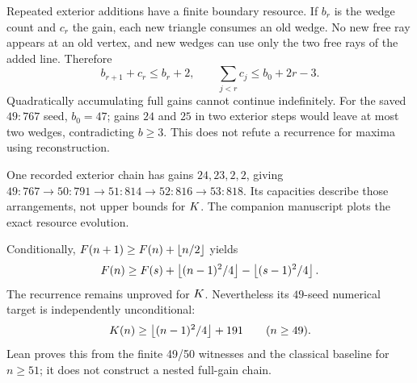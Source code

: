 Repeated exterior additions have a finite boundary resource.  If $b_r$
is the wedge count and $c_r$ the gain, each new triangle consumes an
old wedge.  No new free ray appears at an old vertex, and new wedges
can use only the two free rays of the added line.  Therefore
\begin{equation}
 b_{r+1}+c_r\le b_r+2,\qquad
 \sum_{j<r}c_j\le b_0+2r-3.
 \label{jext:budget}
\end{equation}
Quadratically accumulating full gains cannot continue indefinitely.
For the saved $49:767$ seed, $b_0=47$; gains $24$ and $25$ in two
exterior steps would leave at most two wedges, contradicting $b\ge3$.
This does not refute a recurrence for maxima using reconstruction.

One recorded exterior chain has gains $24,23,2,2$, giving
$49{:}767\to50{:}791\to51{:}814\to52{:}816\to53{:}818$.
Its capacities describe those arrangements, not upper bounds for $K$.
The companion manuscript plots the exact resource evolution.


Conditionally, $F(n+1)\ge F(n)+\left\lfloor n/2\right\rfloor$ yields
\[
 F(n)\ge F(s)+\left\lfloor(n-1)^2/4\right\rfloor-\left\lfloor(s-1)^2/4\right\rfloor.
\]
The recurrence remains unproved for $K$.  Nevertheless its $49$-seed
numerical target is independently unconditional:
\begin{equation}
 K(n)\ge\left\lfloor(n-1)^2/4\right\rfloor+191\qquad(n\ge49).
 \label{jext:49}
\end{equation}
Lean proves this from the finite 49/50 witnesses and the classical
baseline for $n\ge51$; it does not construct a nested full-gain chain.

